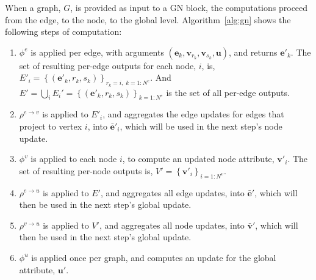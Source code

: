 \documentclass[10pt]{book}
\newcommand{\uv}{\mathbf{u}}    %
\newcommand{\ev}{\mathbf{e}}    %
\newcommand{\vv}{\mathbf{v}}    %
\begin{document}
When a graph, $G$, is provided as input to a GN block, the computations proceed from the edge, to the node, to the global level.
Algorithm~\ref{alg:gn} shows the following steps of computation:
\begin{enumerate}[noitemsep]
    \item $\phi^e$ is applied per edge, with arguments $(\ev_k, \vv_{r_k}, \vv_{s_k}, \uv)$, and returns $\ev'_k$. The set of resulting per-edge outputs for each node, $i$, is, $E'_i = \left\{\left(\mathbf{e}'_k, r_k, s_k \right)\right\}_{r_k=i,\; k=1:N^e}$. And $E' = \bigcup_i E_i' = \left\{\left(\mathbf{e}'_k, r_k, s_k \right)\right\}_{k=1:N^e}$ is the set of all per-edge outputs.
    
    \item $\rho^{e\rightarrow v}$ is applied to $E'_i$, and aggregates the edge updates for edges that project to vertex $i$, into $\mathbf{\bar{e}}'_i$, which will be used in the next step's node update.
    
    \item $\phi^v$ is applied to each node $i$, to compute an updated node attribute, $\mathbf{v}'_i$. The set of resulting per-node outputs is, $V'=\left\{\mathbf{v}'_i\right\}_{i=1:N^v}$.
    
    \item $\rho^{e\rightarrow u}$ is applied to $E'$, and aggregates all edge updates, into $\mathbf{\bar{e}}'$, which will then be used in the next step's global update.
    
    \item $\rho^{v \rightarrow u}$ is applied to $V'$, and aggregates all node updates, into $\mathbf{\bar{v}}'$, which will then be used in the next step's global update.
    
    \item $\phi^u$ is applied once per graph, and computes an update for the global attribute, $\uv'$.
\end{enumerate}













\printindex

\nocite{*}

\end{document}
